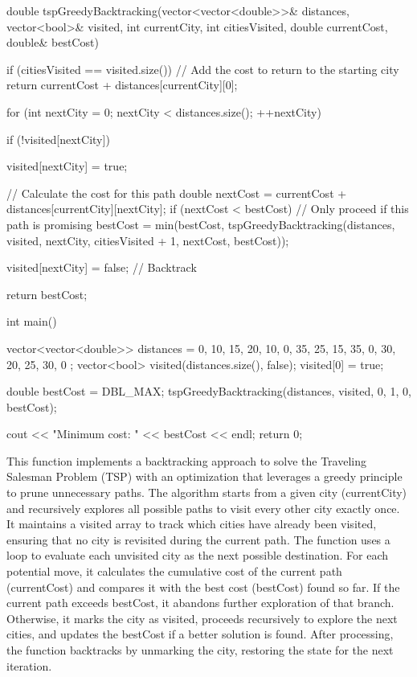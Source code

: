 \documentclass{report}
\begin{document}
\pagebreak 
\begin{cppcode}
    double tspGreedyBacktracking(vector<vector<double>>& distances, vector<bool>& visited, int currentCity, int citiesVisited, double currentCost, double& bestCost) {
        if (citiesVisited == visited.size()) {
            // Add the cost to return to the starting city
            return currentCost + distances[currentCity][0];
        }

        for (int nextCity = 0; nextCity < distances.size(); ++nextCity) {
            if (!visited[nextCity]) {
                visited[nextCity] = true;

                // Calculate the cost for this path
                double nextCost = currentCost + distances[currentCity][nextCity];
                if (nextCost < bestCost) { // Only proceed if this path is promising
                    bestCost = min(bestCost, tspGreedyBacktracking(distances, visited, nextCity, citiesVisited + 1, nextCost, bestCost));
                }

                visited[nextCity] = false; // Backtrack
            }
        }
        return bestCost;
    }
    int main() {
        vector<vector<double>> distances = {
            {0, 10, 15, 20},
            {10, 0, 35, 25},
            {15, 35, 0, 30},
            {20, 25, 30, 0}
        };
        vector<bool> visited(distances.size(), false);
        visited[0] = true;

        double bestCost = DBL_MAX;
        tspGreedyBacktracking(distances, visited, 0, 1, 0, bestCost);

        cout << "Minimum cost: " << bestCost << endl;
        return 0;
    }
\end{cppcode}
\bigbreak \noindent 
This function implements a backtracking approach to solve the Traveling Salesman Problem (TSP) with an optimization that leverages a greedy principle to prune unnecessary paths. The algorithm starts from a given city (currentCity) and recursively explores all possible paths to visit every other city exactly once. It maintains a visited array to track which cities have already been visited, ensuring that no city is revisited during the current path.
\bigbreak \noindent 
The function uses a loop to evaluate each unvisited city as the next possible destination. For each potential move, it calculates the cumulative cost of the current path (currentCost) and compares it with the best cost (bestCost) found so far. If the current path exceeds bestCost, it abandons further exploration of that branch. Otherwise, it marks the city as visited, proceeds recursively to explore the next cities, and updates the bestCost if a better solution is found. After processing, the function backtracks by unmarking the city, restoring the state for the next iteration.
\end{document}

